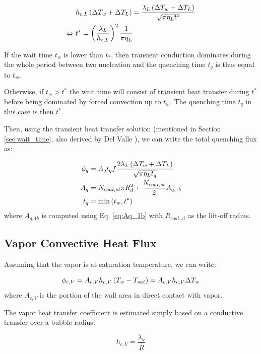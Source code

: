 \begin{align}
&h_{c,L}\left( \Delta T_{w} + \Delta T_{L} \right) = \frac{\lambda_{L}\left( \Delta T_{w} + \Delta T_{L} \right)}{\sqrt{\pi\eta_{L}t^{*}}}\\
\Leftrightarrow\  &t^{*} = \left( \frac{\lambda_{L}}{h_{c,L}} \right)^{2}\frac{1}{\pi \eta_{L}}
\label{eq:tstar}
\end{align}

If the wait time $t_{w}$ is lower than $t_{*}$, then transient conduction dominates during the whole period between two nucleation and the quenching time $t_{q}$ is thus equal to $t_{w}$.

Otherwise, if $t_{w}>t^{*}$ the wait time will consist of transient heat transfer during $t^{*}$ before being dominated by forced convection up to $t_{w}$. The quenching time $t_{q}$ in this case is then $t^{*}$.

Then, using the transient heat transfer solution (mentioned in Section \ref{sec:wait_time}, also derived by Del Valle \cite{del_valle_subcooled_1985}), we can write the total quenching flux as:

\begin{align}
\phi_{q} &= A_{q}t_{q}f \frac{2\lambda_{L}\left( \Delta T_{w} + \Delta T_{L} \right)}{\sqrt{\pi \eta_{L}t_{q}} }\\
A_{q} &= N_{coal,st} \pi R_{d}^{2} + \frac{N_{coal,sl}}{2} A_{q,1b} \\
t_{q} &= \mathrm{min}\left( t_{w}, t^{*} \right)
\end{align}
where $A_{q,1b}$ is computed using Eq. \ref{eq:Aq_1b} with $R_{coal,sl}$ as the lift-off radius.


\subsection{Vapor Convective Heat Flux}

Assuming that the vapor is at saturation temperature, we can write:

\begin{align}
\phi_{c,V} = A_{c,V} h_{c,V} \left( T_{w}-T_{sat} \right) = A_{c,V} h_{c,V} \Delta T_{w}
\end{align}
where $A_{c,V}$ is the portion of the wall area in direct contact with vapor.

\npar

The vapor heat transfer coefficient is estimated simply based on a conductive transfer over a bubble radius:

\begin{equation}
h_{c,V} = \dfrac{\lambda_{V}}{\overline{R}}
\end{equation}

